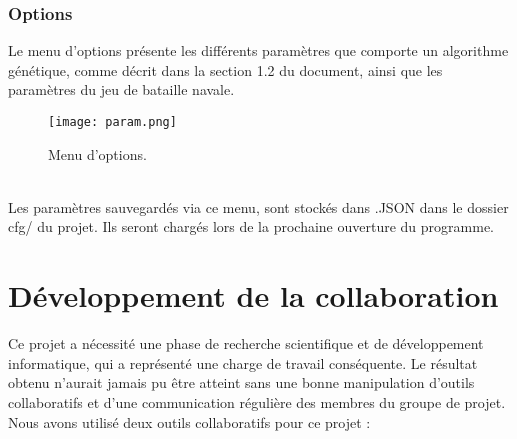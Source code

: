 \documentclass[12pt]{report}
\begin{document}
	\subsubsection{Options}
	Le menu d'options présente les différents paramètres que comporte un algorithme génétique, comme décrit dans la section 1.2 du document, ainsi que les paramètres du jeu de bataille navale.
	\begin{figure}[h]
		\captionsetup{justification=centering}
    	\begin{center}
		\texttt{[image: param.png]}
		\caption{Menu d'options.}
		\end{center}
	\end{figure}
	\\Les paramètres sauvegardés via ce menu, sont stockés dans .JSON dans le dossier cfg/ du projet. Ils seront chargés lors de la prochaine ouverture du programme.

\section{Développement de la collaboration}
Ce projet a nécessité une phase de recherche scientifique et de développement informatique, qui a représenté une charge de travail conséquente. Le résultat obtenu n'aurait jamais pu être atteint sans une bonne manipulation d'outils collaboratifs et d'une communication régulière des membres du groupe de projet.\\
	Nous avons utilisé deux outils collaboratifs pour ce projet :
\end{document}
